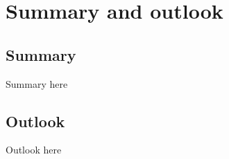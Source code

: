 \chapter{Summary and outlook}\label{ch:summary_outlook}
\section{Summary}
Summary here
\section{Outlook}
Outlook here